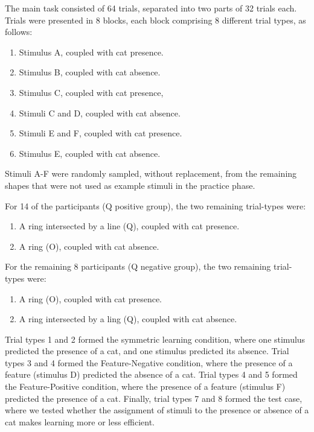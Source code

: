 \documentclass[
]{article}
\providecommand{\tightlist}{%
  \setlength{\itemsep}{0pt}\setlength{\parskip}{0pt}}
\begin{document}
The main task consisted of 64 trials, separated into two parts of 32
trials each. Trials were presented in 8 blocks, each block comprising 8
different trial types, as follows:

\begin{enumerate}
\def\labelenumi{\arabic{enumi}.}
\tightlist
\item
  Stimulus A, coupled with cat presence.
\item
  Stimulus B, coupled with cat absence.
\item
  Stimulus C, coupled with cat presence,
\item
  Stimuli C and D, coupled with cat absence.
\item
  Stimuli E and F, coupled with cat presence.
\item
  Stimulus E, coupled with cat absence.
\end{enumerate}

Stimuli A-F were randomly sampled, without replacement, from the
remaining shapes that were not used as example stimuli in the practice
phase.

For 14 of the participants (Q positive group), the two remaining
trial-types were:

\begin{enumerate}
\def\labelenumi{\arabic{enumi}.}
\setcounter{enumi}{6}
\tightlist
\item
  A ring intersected by a line (Q), coupled with cat presence.
\item
  A ring (O), coupled with cat absence.
\end{enumerate}

For the remaining 8 participants (Q negative group), the two remaining
trial-types were:

\begin{enumerate}
\def\labelenumi{\arabic{enumi}.}
\setcounter{enumi}{6}
\tightlist
\item
  A ring (O), coupled with cat presence.
\item
  A ring intersected by a ling (Q), coupled with cat absence.
\end{enumerate}

Trial types 1 and 2 formed the symmetric learning condition, where one
stimulus predicted the presence of a cat, and one stimulus predicted its
absence. Trial types 3 and 4 formed the Feature-Negative condition,
where the presence of a feature (stimulus D) predicted the absence of a
cat. Trial types 4 and 5 formed the Feature-Positive condition, where
the presence of a feature (stimulus F) predicted the presence of a cat.
Finally, trial types 7 and 8 formed the test case, where we tested
whether the assignment of stimuli to the presence or absence of a cat
makes learning more or less efficient.
\end{document}
